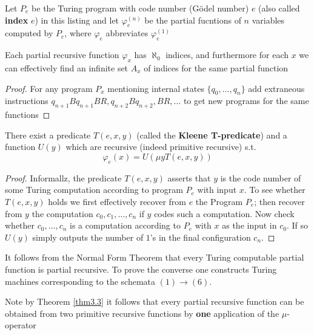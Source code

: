 \documentclass[11pt]{article}
\begin{document}
\begin{definition}[]
Let \(P_e\) be the Turing program with code number (Gödel number) \(e\) 
(also called \textbf{index} \(e\)) in this
listing and let \(\varphi_e^{(n)}\) be the partial fucntions of \(n\) variables
computed by \(P_e\), where \(\varphi_e\) abbreviates \(\varphi_e^{(1)}\)
\end{definition}

\begin{lemma}
\label{lemma1.3.2}
Each partial recursive function \(\varphi_x\) has \(\aleph_0\) indices, and
furthermore for each \(x\) we can effectively find an infinite set \(A_x\) of
indices for the same partial function
\end{lemma}


\begin{proof}
For any program \(P_x\) mentioning internal states \(\{q_0,\dots,q_n\}\) add
extraneous instructions \(q_{n+1}Bq_{n+1}BR,q_{n+2}Bq_{n+2},BR,\dots\) to get
new programs for the same functions
\end{proof}
\begin{theorem}
\label{thm3.3}
There exist a predicate \(T(e,x,y)\) (called the \textbf{Kleene T-predicate}) and a
function \(U(y)\) which are recursive (indeed primitive recursive) s.t.
\begin{equation*}
\varphi_e(x)=U(\mu y T(e,x,y))
\end{equation*}
\end{theorem}

\begin{proof}
Informallz, the predicate \(T(e,x,y)\) asserts that \(y\) is the code number
of some Turing computation according to program \(P_e\) with input \(x\). To
see whether \(T(e,x,y)\) holds we first effectively recover from \(e\) the
Program \(P_e\); then recover from \(y\) the computation
\(c_0,c_1,\dots,c_n\) if \(y\) codes such a computation. Now check whether
\(c_0,\dots,c_n\) is a computation according to \(P_e\) with \(x\) as the
input in \(c_0\). If so \(U(y)\) simply outputs the number of \(1\)'s in the
final configuration \(c_n\).
\end{proof}

It follows from the Normal Form Theorem that every Turing computable partial
function is partial recursive. To prove the converse one constructs Turing
machines corresponding to the schemata \((1)\to(6)\).

Note by Theorem \ref{thm3.3} it follows that every partial recursive function
can be obtained from two primitive recursive functions by \textbf{one} application
of the \(\mu\)-operator
\end{document}
